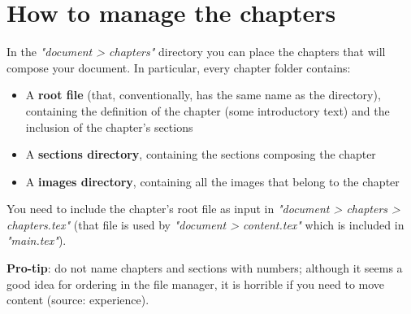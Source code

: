 \chapter{How to manage the chapters}\label{how_to_manage_files}
In the \textit{"document > chapters"} directory you can place the chapters that will compose your document.
In particular, every chapter folder contains:
\begin{itemize}
    \item A \textbf{root file} (that, conventionally, has the same name as the directory), containing the definition of the chapter (some introductory text) and the inclusion of the chapter's sections
    \item A \textbf{sections directory}, containing the sections composing the chapter
    \item A \textbf{images directory}, containing all the images that belong to the chapter
\end{itemize}

You need to include the chapter's root file as input in \textit{"document > chapters > chapters.tex"} (that file is used by \textit{"document > content.tex"} which is included in \textit{"main.tex"}).

\textbf{Pro-tip}: do not name chapters and sections with numbers; although it seems a good idea for ordering in the file manager, it is horrible if you need to move content (source: experience).





